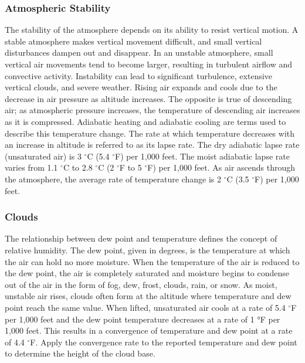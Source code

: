 \documentclass[12pt]{article}
\begin{document}
		\subsubsection{Atmospheric Stability}

			The stability of the atmosphere depends on its ability to resist vertical motion. A stable atmosphere makes vertical movement difficult, and small vertical disturbances dampen out and disappear. In an unstable atmosphere, small vertical air movements tend to become larger, resulting in turbulent airflow and convective activity. Instability can lead to significant turbulence, extensive vertical clouds, and severe weather. Rising air expands and cools due to the decrease in air pressure as altitude increases. The opposite is true of descending air; as atmospheric pressure increases, the temperature of descending air increases as it is compressed. Adiabatic heating and adiabatic cooling are terms used to describe this temperature change.  The rate at which temperature decreases with an increase in altitude is referred to as its lapse rate.  The dry adiabatic lapse rate (unsaturated air) is 3 $^\circ$C (5.4 $^\circ$F) per 1,000 feet. The moist adiabatic lapse rate varies from 1.1 $^\circ$C to 2.8 $^\circ$C (2 $^\circ$F to 5 $^\circ$F) per 1,000 feet.  As air ascends through the atmosphere, the average rate of temperature change is 2 $^\circ$C (3.5 $^\circ$F) per 1,000 feet.

		\subsubsection{Clouds}
			The relationship between dew point and temperature defines the concept of relative humidity. The dew point, given in degrees, is the temperature at which the air can hold no more moisture. When the temperature of the air is reduced to the dew point, the air is completely saturated and moisture begins to condense out of the air in the form of fog, dew, frost, clouds, rain, or snow. As moist, unstable air rises, clouds often form at the altitude where temperature and dew point reach the same value. When lifted, unsaturated air cools at a rate of 5.4 $^\circ$F per 1,000 feet and the dew point temperature decreases at a rate of 1 °F per 1,000 feet. This results in a convergence of temperature and dew point at a rate of 4.4 $^\circ$F. Apply the convergence rate to the reported temperature and dew point to determine the height of the cloud base.
\end{document}
